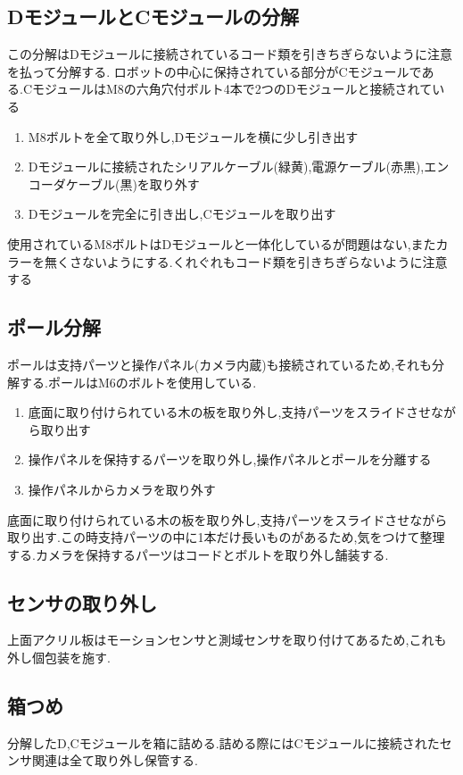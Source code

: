 \subsection{DモジュールとCモジュールの分解}
この分解はDモジュールに接続されているコード類を引きちぎらないように注意を払って分解する.
ロボットの中心に保持されている部分がCモジュールである.CモジュールはM8の六角穴付ボルト4本で2つのDモジュールと接続されている
\begin{enumerate}
 \item M8ボルトを全て取り外し,Dモジュールを横に少し引き出す
 \item Dモジュールに接続されたシリアルケーブル(緑黄),電源ケーブル(赤黒),エンコーダケーブル(黒)を取り外す
 \item Dモジュールを完全に引き出し,Cモジュールを取り出す
\end{enumerate}
使用されているM8ボルトはDモジュールと一体化しているが問題はない,またカラーを無くさないようにする.くれぐれもコード類を引きちぎらないように注意する

\subsection{ポール分解}
ポールは支持パーツと操作パネル(カメラ内蔵)も接続されているため,それも分解する.ポールはM6のボルトを使用している.
\begin{enumerate}
 \item 底面に取り付けられている木の板を取り外し,支持パーツをスライドさせながら取り出す
 \item 操作パネルを保持するパーツを取り外し,操作パネルとポールを分離する 
 \item 操作パネルからカメラを取り外す
\end{enumerate}

底面に取り付けられている木の板を取り外し,支持パーツをスライドさせながら取り出す.この時支持パーツの中に1本だけ長いものがあるため,気をつけて整理する.カメラを保持するパーツはコードとボルトを取り外し舗装する.

\subsection{センサの取り外し}
上面アクリル板はモーションセンサと測域センサを取り付けてあるため,これも外し個包装を施す.

\subsection{箱つめ}
分解したD,Cモジュールを箱に詰める.詰める際にはCモジュールに接続されたセンサ関連は全て取り外し保管する.


